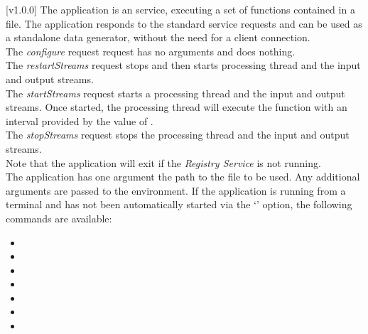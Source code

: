 [v1.0.0]
The  application is an  service,
executing a set of \JS{} functions contained in a file.
The application responds to the standard  service requests and can be used
as a standalone data generator, without the need for a client connection.\\

The \emph{configure} request request has no arguments and does nothing.\\

The \emph{restartStreams} request stops and then starts processing thread and the input
and output streams.\\

The \emph{startStreams} request starts a processing thread and the input and output
streams.
Once started, the processing thread will execute the  function with
an interval provided by the value of .\\

The \emph{stopStreams} request stops the processing thread and the input and output
streams.\\ 

Note that the application will exit if the \emph{Registry Service} is not running.\\

The application has one argument \longDash{} the path to the \JS{} file to be used.
Any additional arguments are passed to the \JS{} environment.
\insertAppParameters
\insertTagDescription{\JSIO}
\insertFilterServiceComment
\condPage{}
If the application is running from a terminal and has not been automatically started via
the `' option, the following commands are available:
\begin{itemize}
\item{}
\item\exSp{}
\item\exSp{}
\item\exSp{}
\item\exSp{}
\item\exSp{}
\item\exSp{}
\end{itemize}
\primaryEnd{}
